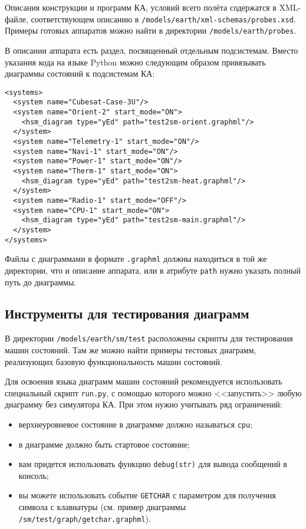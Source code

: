 \documentclass[12pt,a4paper]{article}
\begin{document}
Описания конструкции и программ КА, условий всего полёта содержатся в XML-файле,
соответствующем описанию в \verb'/models/earth/xml-schemas/probes.xsd'. Примеры готовых
аппаратов можно найти в директории \verb'/models/earth/probes'.

В описании аппарата есть раздел, посвященный отдельным подсистемам. Вместо указания кода
на языке Python можно следующим образом привязывать диаграммы состояний к подсистемам КА:

\begin{verbatim}
<systems>
  <system name="Cubesat-Case-3U"/>
  <system name="Orient-2" start_mode="ON">
    <hsm_diagram type="yEd" path="test2sm-orient.graphml"/>
  </system>
  <system name="Telemetry-1" start_mode="ON"/>
  <system name="Navi-1" start_mode="ON"/>
  <system name="Power-1" start_mode="ON"/>
  <system name="Therm-1" start_mode="ON">
    <hsm_diagram type="yEd" path="test2sm-heat.graphml"/>
  </system>
  <system name="Radio-1" start_mode="OFF"/>
  <system name="CPU-1" start_mode="ON">
    <hsm_diagram type="yEd" path="test2sm-main.graphml"/>
  </system>
</systems>
\end{verbatim}

Файлы с диаграммами в формате \verb'.graphml' должны находиться в той же директории, что и
описание аппарата, или в атрибуте \verb'path' нужно указать полный путь до диаграммы.

\subsection*{Инструменты для тестирования диаграмм}

В директории \verb'/models/earth/sm/test' расположены скрипты для тестирования машин
состояний. Там же можно найти примеры тестовых диаграмм, реализующих базовую
функциональность машин состояний.

Для освоения языка диаграмм машин состояний рекомендуется использовать
специальный скрипт \verb'run.py', с помощью которого можно <<запустить>> любую диаграмму
без симулятора КА. При этом нужно учитывать ряд ограничений:

\begin{itemize}
\item верхнеуровневое состояние в диаграмме должно называться \verb'cpu';
\item в диаграмме должно быть стартовое состояние;
\item вам придется использовать функцию \verb'debug(str)' для вывода сообщений в консоль;
\item вы можете использовать событие \verb'GETCHAR' с параметром для получения символа с
  клавиатуры (см. пример диаграммы \verb'/sm/test/graph/getchar.graphml').
\end{itemize}
\end{document}
